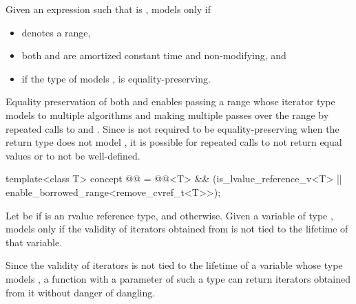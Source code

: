 \begin{itemdescr}
\pnum
Given an expression  such that  is ,
 models  only if
\begin{itemize}
\item {}
  denotes a range,

\item both
and
are amortized constant time and non-modifying, and

\item if the type of  models
,  is equality-preserving.
\end{itemize}

\pnum
\begin{note}
Equality preservation of both  and
 enables passing a range whose iterator
type models  to multiple
algorithms and making multiple passes over the range by repeated calls to
 and .
Since  is not required to be equality-preserving
when the return type does not model ,
it is possible for repeated calls
to not return equal values or to not be well-defined.
\end{note}
\end{itemdescr}

\begin{itemdecl}
template<class T>
  concept @@ =
    @@<T> && (is_lvalue_reference_v<T> || enable_borrowed_range<remove_cvref_t<T>>);
\end{itemdecl}

\begin{itemdescr}
\pnum
Let  be 
if  is an rvalue reference type, and  otherwise.
Given a variable  of type ,
 models  only if
the validity of iterators obtained from 
is not tied to the lifetime of that variable.

\pnum
\begin{note}
Since the validity of iterators is not tied to the lifetime of
a variable whose type models ,
a function with a parameter of such a type can
return iterators obtained from it without danger of dangling.
\end{note}
\end{itemdescr}

